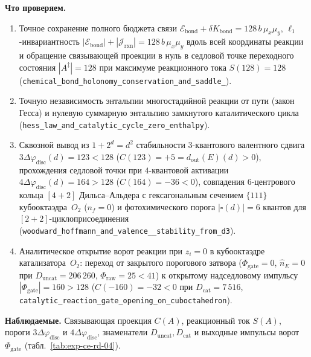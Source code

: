 \textbf{Что проверяем.}
{\sloppy
\begin{enumerate}[label=\textbf{(\alph*)},leftmargin=*,itemsep=0.25em]
\item Точное сохранение полного бюджета связи $\mathcal{E}_{\mathrm{bond}} + \delta K_{\mathrm{bond}} = 128\,b\,\mu_x\mu_y$, $\ell_1$-инвариантность $|\mathcal{E}_{\mathrm{bond}}| + |\mathcal{J}_{\mathrm{rxn}}| = 128\,b\,\mu_x\mu_y$ вдоль всей координаты реакции и обращение связывающей проекции в нуль в седловой точке переходного состояния $|A^\ddagger| = 128$ при максимуме реакционного тока $S(128) = 128$ (\texttt{chemical\_\allowbreak bond\_\allowbreak holonomy\_\allowbreak conservation\_\allowbreak and\_\allowbreak saddle\_}).
\item Точную независимость энтальпии многостадийной реакции от пути (закон Гесса) и нулевую суммарную энтальпию замкнутого каталитического цикла (\texttt{hess\_\allowbreak law\_\allowbreak and\_\allowbreak catalytic\_\allowbreak cycle\_\allowbreak zero\_\allowbreak enthalpy}).
\item Сквозной вывод из $1+2^d=d^2$ стабильности $3$-квантового валентного сдвига $3\Delta\varphi_{\mathrm{disc}}(d) = 123 < 128$ ($C(123) = +5 = d_{\mathrm{out}}(E)(d) > 0$), прохождения седловой точки при $4$-квантовой активации $4\Delta\varphi_{\mathrm{disc}}(d) = 164 > 128$ ($C(164) = -36 < 0$), совпадения $6$-центрового кольца $[4+2]$ Дильса--Альдера с гексагональным сечением $\{111\}$ кубооктаэдра~$O_2$ ($n_f=0$) и фотохимического порога $|\square(d)| = 6$ квантов для $[2+2]$-циклоприсоединения (\texttt{woodward\_\allowbreak hoffmann\_\allowbreak and\_\allowbreak valence\_\_\allowbreak stability\_\allowbreak from\_\allowbreak d3}).
\item Аналитическое открытие ворот реакции при $z_i = 0$ в кубооктаэдре катализатора~$O_2$: переход от закрытого порогового затвора ($\Phi_{\mathrm{gate}} = 0$, $\widehat{n}_E = 0$ при $D_{\mathrm{uncat}} = 206\,260$, $\Phi_{\mathrm{raw}} = 25 < 41$) к открытому надседловому импульсу $|\Phi_{\mathrm{gate}}| = 160 > 128$ ($C(-160) = -32 < 0$ при $D_{\mathrm{cat}} = 7\,516$, \texttt{catalytic\_\allowbreak reaction\_\allowbreak gate\_\allowbreak opening\_\allowbreak on\_\allowbreak cuboctahedron}).
\end{enumerate}\par}

\textbf{Наблюдаемые.}
Связывающая проекция $C(A)$, реакционный ток $S(A)$, пороги $3\Delta\varphi_{\mathrm{disc}}$ и $4\Delta\varphi_{\mathrm{disc}}$, знаменатели $D_{\mathrm{uncat}}, D_{\mathrm{cat}}$ и выходные импульсы ворот $\Phi_{\mathrm{gate}}$ (табл.~\ref{tab:exp-ce-rd-04}).

